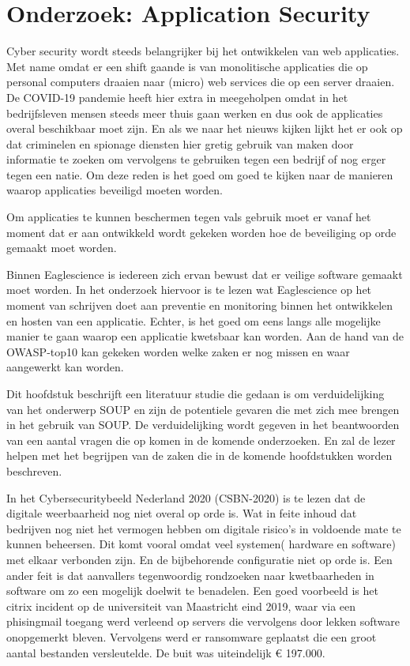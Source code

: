 
\chapter{Onderzoek: Application Security}\label{ch:onderzoek:-application-security}

Cyber security wordt steeds belangrijker bij het ontwikkelen van web applicaties.
Met name omdat er een shift gaande is van monolitische applicaties die op personal computers draaien naar (micro) web services die op een server draaien.
De COVID-19 pandemie heeft hier extra in meegeholpen omdat in het bedrijfsleven mensen steeds meer thuis gaan werken en dus ook de applicaties overal beschikbaar moet zijn.
En als we naar het nieuws kijken lijkt het er ook op dat criminelen en spionage diensten hier gretig gebruik van maken door informatie te zoeken om vervolgens te gebruiken tegen een bedrijf of nog erger tegen een natie. Om deze reden is het goed om goed te kijken naar de manieren waarop applicaties beveiligd moeten worden.

Om applicaties te kunnen beschermen tegen vals gebruik moet er vanaf het moment dat er aan ontwikkeld wordt gekeken worden hoe de beveiliging op orde gemaakt moet worden.

Binnen Eaglescience is iedereen zich ervan bewust dat er veilige software gemaakt moet worden. In het onderzoek hiervoor is te lezen wat Eaglescience op het moment van schrijven doet aan preventie en monitoring binnen het ontwikkelen en hosten van een applicatie. Echter, is het goed om eens langs alle mogelijke manier te gaan waarop een applicatie kwetsbaar kan worden. Aan de hand van de OWASP-top10 kan gekeken worden welke zaken er nog missen en waar aangewerkt kan worden.





Dit hoofdstuk beschrijft een literatuur studie die gedaan is om verduidelijking van het onderwerp SOUP en zijn de potentiele gevaren die met zich mee brengen in het gebruik van SOUP. De verduidelijking wordt gegeven in het beantwoorden van een aantal vragen die op komen in de komende onderzoeken.
En zal de lezer helpen met het begrijpen van de zaken die in de komende hoofdstukken worden beschreven.


In het Cybersecuritybeeld Nederland 2020 (CSBN-2020) is te lezen dat de digitale weerbaarheid nog niet overal op orde is.
Wat in feite inhoud dat bedrijven nog niet het vermogen hebben om digitale risico's in voldoende mate te kunnen beheersen.
Dit komt vooral omdat veel systemen( hardware en software) met elkaar verbonden zijn.
En de bijbehorende configuratie niet op orde is.
Een ander feit is dat aanvallers tegenwoordig rondzoeken naar kwetbaarheden in software om zo een mogelijk doelwit te benadelen.
Een goed voorbeeld is het citrix incident op de universiteit van Maastricht eind 2019, waar via een phisingmail toegang werd verleend op servers die vervolgens door lekken software onopgemerkt bleven.
Vervolgens werd er ransomware geplaatst die een groot aantal bestanden versleutelde.
De buit was uiteindelijk € 197.000.

